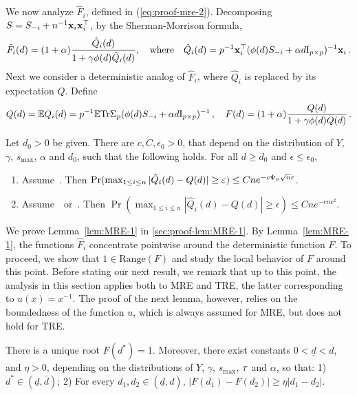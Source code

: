 \documentclass[times,sort&compress,3p]{elsarticle}
\begin{document}
We now analyze $\hat{F}_i$, defined in (\ref{eq:proof-mre-2}). Decomposing $S=S_{-i} + n^{-1}{\bf x}_i{\bf x}_i^\top$, by the Sherman-Morrison formula, 
\begin{equation}
    \hat{F}_i(d) = (1+\alpha) \frac{\hat{Q}_i(d)}{1+\gamma \phi(d) \hat{Q}_i(d)},\quad\textrm{where}\quad \hat{Q}_i(d) = p^{-1} {\bf x}_i^\top ( \phi(d)S_{-i}+\alpha d \mathrm{I}_{p \times p})^{-1} {\bf x}_i \,.
\end{equation}
Next we consider a deterministic analog of $\hat{F}_i$, where $\hat{Q}_i$ is replaced by its expectation $Q$. 
Define
\begin{equation}\label{eq:proof-mre-4}
    Q(d) = {\mathbb{E}} Q_i(d) = p^{-1}{\mathbb{E}} \textrm{Tr}\Sigma_p(\phi(d)S_{-i}+\alpha d \mathrm{I}_{p \times p})^{-1} \,,\quad F(d) = (1+\alpha)\frac{Q(d)}{1+\gamma\phi(d) Q(d)} \,.
\end{equation}
\begin{lemma}\label{lem:MRE-1}
    Let $d_0>0$ be given. There are $c,C,\epsilon_0>0$, that depend on the distribution of $Y$, $\gamma$, $s_{\max}$, $\alpha$ and $d_0$, such that the following holds. For all $d\ge d_0$ and $\epsilon\le \epsilon_0$,
    \begin{enumerate}
        \item Assume~\AssumLC. Then $\Pr(\max_{1\le i \le n}|\hat{Q}_i(d)-Q(d)|\ge \varepsilon) \le Cne^{-c\Psi_p \sqrt{n}\varepsilon}$.
        \item Assume~\AssumIndep~or~\AssumCCPSB. Then $\Pr(\max_{1\le i \le n}|\hat{Q}_i(d)-Q(d)|\ge \epsilon) \le Cne^{-cn\epsilon^2}$. 
    \end{enumerate}
\end{lemma}
We prove Lemma~\ref{lem:MRE-1} in 
\ref{sec:proof-lem:MRE-1}.
By Lemma~\ref{lem:MRE-1}, the functions $\hat{F}_i$ concentrate pointwise around the deterministic function $F$. To proceed, we  show that $1\in \mathrm{Range}(F)$ and  study the local behavior of $F$ around this point. 
Before stating our next result, we remark that up to this point, the analysis in this section applies both to MRE and TRE, the latter corresponding to $u(x)=x^{-1}$. The proof of the next lemma, however, relies on the boundedness of the function $u$, which is always assumed for MRE, but does not hold for TRE.
\begin{lemma}\label{lem:MRE-2}
    There 
    is a unique root
    $F(d^*)=1$. Moreover, there exist constants $0<\underline{d}<\overline{d}$, and $\eta>0$, depending on the distributions of $Y$, $\gamma$, $s_{\max}$, $\tau$ and $\alpha$, so that: 1) $d^*\in (\underline{d},\overline{d})$; 2) For every $d_1,d_2\in (\underline{d},\overline{d})$, $|F(d_1)-F(d_2)|\ge \eta|d_1-d_2|$.
\end{lemma}
\end{document}
